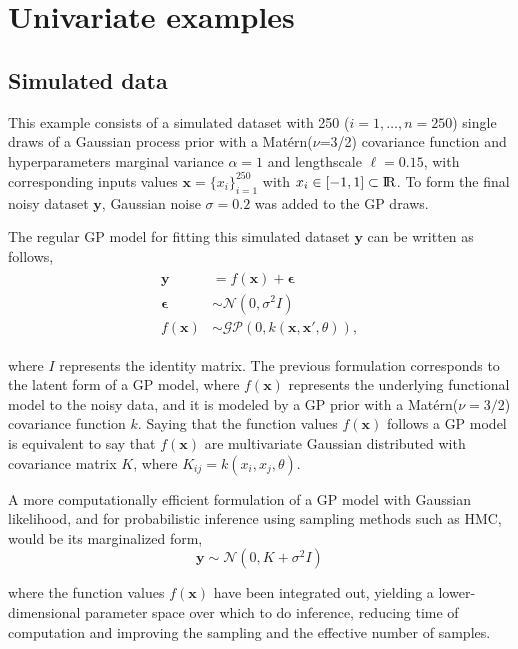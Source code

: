 \documentclass[]{interact}
\theoremstyle{plain}%
\theoremstyle{definition}
\theoremstyle{remark}
\begin{document}
\section{Univariate examples}


\subsection{Simulated data}

This example consists of a simulated dataset with 250 ($i=1,\dots,n=250$) single draws of a Gaussian process prior with a Mat{\'e}rn($\nu$=3/2) covariance function and hyperparameters marginal variance $\alpha=1$ and lengthscale $\ell=0.15$, with corresponding inputs values $\mathbf{x}=\{x_i\}_{i=1}^{250}$ with $x_i \in [-1,1] \subset {\rm I\!R}$. To form the final noisy dataset $\mathbf{y}$, Gaussian noise $\sigma=0.2$ was added to the GP draws.

The regular GP model for fitting this simulated dataset $\mathbf{y}$ can be written as follows,
%
\begin{eqnarray*}\label{eq:latentgp_simudata1}
\begin{split}
\mathbf{y} &= f(\mathbf{x}) + \boldsymbol{\epsilon} \\
\boldsymbol{\epsilon} &\sim \mathcal{N}(0, \sigma^2  I) \\
f(\mathbf{x}) &\sim \mathcal{GP}(0, k(\mathbf{x}, \mathbf{x}', \theta)),
\end{split}
\end{eqnarray*}

\noindent where $I$ represents the identity matrix. The previous formulation corresponds to the latent form of a GP model, where $f(\mathbf{x})$ represents the underlying functional model to the noisy data, and it is modeled by a GP prior with a Mat{\'e}rn($\nu=3/2$) covariance function $k$. Saying that the function values $f(\mathbf{x})$ follows a GP model is equivalent to say that $f(\mathbf{x})$ are multivariate Gaussian distributed with covariance matrix $K$, where $K_{ij}=k(x_i,x_j,\theta)$.
 
A more computationally efficient formulation of a GP model with Gaussian likelihood, and for probabilistic inference using sampling methods such as HMC, would be its marginalized form,
%
\begin{equation*}\label{eq:marginalizedgp_simudata1}
\mathbf{y} \sim \mathcal{N}(0, K + \sigma^2 I )
\end{equation*}

\noindent where the function values $f(\mathbf{x})$ have been integrated out, yielding a lower-dimensional parameter space over which to do inference, reducing time of computation and improving the sampling and the effective number of samples.
\end{document}
